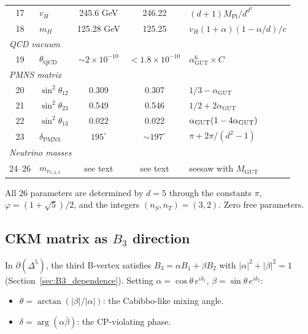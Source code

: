 \begin{center}
\begin{tabular}{clccl}
17 & $v_H$ & 245.6 GeV & 246.22 & $(d\!+\!1)M_\text{Pl}/d^{d^2}$ \\
18 & $m_H$ & 125.28 GeV & 125.25 & $v_H(1\!+\!\alpha)(1\!-\!\alpha/d)/c$ \\
\hline
\multicolumn{5}{l}{\emph{QCD vacuum}} \\
19 & $\theta_\text{QCD}$ & $\sim 2\!\times\! 10^{-10}$ & $< 1.8\!\times\! 10^{-10}$ & $\alpha_\text{GUT}^6 \times C$ \\
\hline
\multicolumn{5}{l}{\emph{PMNS matrix}} \\
20 & $\sin^2\theta_{12}$ & 0.309 & 0.307 & $1/3 - \alpha_\text{GUT}$ \\
21 & $\sin^2\theta_{23}$ & 0.549 & 0.546 & $1/2 + 2\alpha_\text{GUT}$ \\
22 & $\sin^2\theta_{13}$ & 0.022 & 0.022 & $\alpha_{\mathrm{GUT}}(1-4\alpha_{\mathrm{GUT}})$ \\
23 & $\delta_\text{PMNS}$ & $195^\circ$ & $\sim 197^\circ$ & $\pi + 2\pi/(d^2\!-\!1)$ \\
\hline
\multicolumn{5}{l}{\emph{Neutrino masses}} \\
24--26 & $m_{\nu_{1,2,3}}$ & see text & see text & seesaw with $M_\text{GUT}$ \\
\hline
\end{tabular}
\end{center}

\medskip
\noindent All 26 parameters are determined by $d = 5$ through the constants $\pi$, $\varphi = (1+\sqrt{5})/2$, and the integers $(n_S, n_T) = (3, 2)$. Zero free parameters.

\subsection{CKM matrix as $B_3$ direction}
\label{sec:ckm_geometry}

In $\partial(\Delta^5)$, the third B-vertex satisfies $B_3 = \alpha B_1 + \beta B_2$ with $|\alpha|^2 + |\beta|^2 = 1$ (Section~\ref{sec:B3_dependence}).  Setting $\alpha = \cos\theta\,e^{i\delta_1}$, $\beta = \sin\theta\,e^{i\delta_2}$:

\begin{itemize}
\item $\theta = \arctan(|\beta|/|\alpha|)$: the Cabibbo-like mixing angle.
\item $\delta = \arg(\alpha\bar\beta)$: the CP-violating phase.
\end{itemize}

